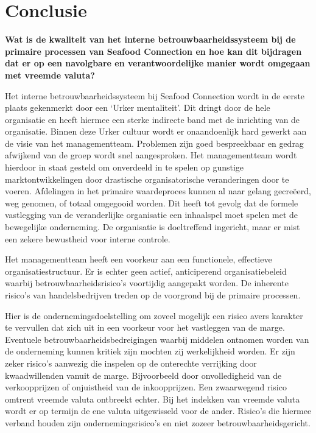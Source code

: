 \chapter{Conclusie}
\label{hoofdstuk:conclusie}
\textbf{Wat is de kwaliteit van het interne betrouwbaarheidssysteem bij de primaire processen van Seafood Connection en hoe kan dit bijdragen dat er op een navolgbare en verantwoordelijke manier wordt omgegaan met vreemde valuta?}

\medskip
Het interne betrouwbaarheidssysteem bij Seafood Connection wordt in de eerste plaats gekenmerkt door een `Urker mentaliteit'. Dit dringt door de hele organisatie en heeft hiermee een sterke indirecte band met de inrichting van de organisatie. Binnen deze Urker cultuur wordt er onaandoenlijk hard gewerkt aan de visie van het managementteam. Problemen zijn goed bespreekbaar en gedrag afwijkend van de groep wordt snel aangesproken. Het managementteam wordt hierdoor in staat gesteld om onverdeeld in te spelen op gunstige marktontwikkelingen door drastische organisatorische veranderingen door te voeren. Afdelingen in het primaire waardeproces kunnen al naar gelang gecreëerd, weg genomen, of totaal omgegooid worden. Dit heeft tot gevolg dat de formele vastlegging van de veranderlijke organisatie een inhaalspel moet spelen met de bewegelijke onderneming. De organisatie is doeltreffend ingericht, maar er mist een zekere bewustheid voor interne controle. 

Het managementteam heeft een voorkeur aan een functionele, effectieve organisatiestructuur. Er is echter geen actief, anticiperend organisatiebeleid waarbij betrouwbaarheidsrisico’s voortijdig aangepakt worden. De inherente risico’s van handelsbedrijven treden op de voorgrond bij de primaire processen.

\vfill
\begin{center}
\end{center}

\noindent
Hier is de ondernemingsdoelstelling om zoveel mogelijk een risico avers karakter te vervullen dat zich uit in een voorkeur voor het vastleggen van de marge. Eventuele betrouwbaarheidsbedreigingen waarbij middelen ontnomen worden van de onderneming kunnen kritiek zijn mochten zij werkelijkheid worden. Er zijn zeker risico's aanwezig die inspelen op de onterechte verrijking door kwaadwillenden vanuit de marge. Bijvoorbeeld door onvolledigheid van de verkoopprijzen of onjuistheid van de inkoopprijzen. Een zwaarwegend risico omtrent vreemde valuta ontbreekt echter. Bij het indekken van vreemde valuta wordt er op termijn de ene valuta uitgewisseld voor de ander. Risico's die hiermee verband houden zijn ondernemingsrisico's en niet zozeer betrouwbaarheidsgericht. 


